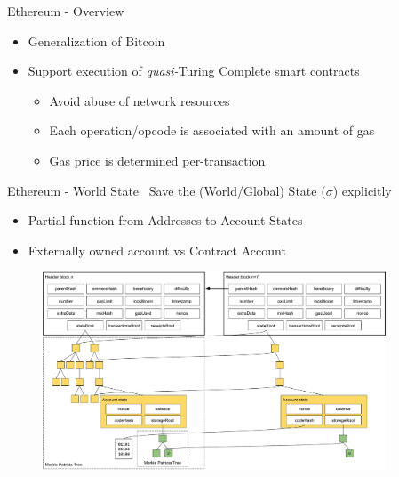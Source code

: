 \begin{frame}{Ethereum - Overview~\cite{bib:yellow}}
\begin{itemize}
\item Generalization of Bitcoin
\item Support execution of \emph{quasi-}Turing Complete smart contracts
\begin{itemize}
\item Avoid abuse of network resources
\item Each operation/opcode is associated with
an amount of gas %
\item Gas price is determined per-transaction
\end{itemize}
\end{itemize}
\end{frame}

\begin{frame}{Ethereum - World State~\cite{bib:yellow}}
	 Save the (World/Global) State ($\sigma$) explicitly
     \begin{itemize}
     \item Partial function from Addresses to Account States
     \item Externally owned account vs Contract Account
    \end{itemize}	
	 
    \begin{figure}
        \begin{center}
            \includegraphics[width=0.91\textwidth]{./img/world-state}
        \end{center}
    \end{figure}
\end{frame}

